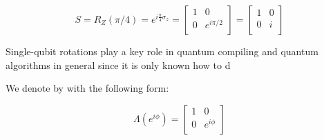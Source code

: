 \documentclass[twocolumn,10pt]{article}
\theoremstyle{plain}
\begin{document}
\begin{equation}
S = R_Z(\pi / 4) = e^{i\frac{\pi}{4}\sigma_z} = 
 \left[
  \begin{array}{cc}
    1 & 0 \\
    0 & e^{i \pi/2} \\
  \end{array} \right]
=
 \left[
  \begin{array}{cc}
    1 & 0 \\
    0 & i \\
  \end{array} \right]
\end{equation}

Single-qubit rotations play a key role in quantum compiling and quantum
algorithms in general since it is only known how to d

We denote by with
the following form:

\begin{equation}
\Lambda(e^{i\phi}) = 
 \left[
  \begin{array}{cc}
    1 & 0 \\
    0 & e^{i\phi} \\
  \end{array} \right]
\end{equation}




\end{document}
